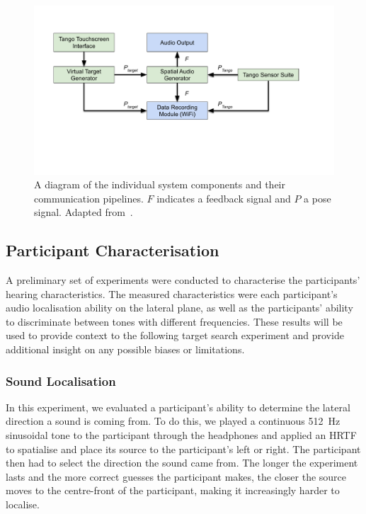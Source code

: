 \documentclass[acmsmall]{acmart}
\begin{document}
\begin{figure}
  \centering
  \includegraphics[clip=true, trim=0 120 80 50, width=0.8\columnwidth]{figures/pipeline.pdf}
  \caption{A diagram of the individual system components and their communication pipelines. $F$ indicates a feedback signal and $P$ a pose signal. Adapted from~\citet{lock2019bone}. }\label{fig:pipeline}
\end{figure}

\subsection{Participant Characterisation}\label{sec:participant_characterisation}

A preliminary set of experiments were conducted to characterise the participants' hearing characteristics.
The measured characteristics were each participant's audio localisation ability on the lateral plane, as well as the participants' ability to discriminate between tones with different frequencies. 
These results will be used to provide context to the following target search experiment and provide additional insight on any possible biases or limitations. 

\subsubsection{Sound Localisation}\label{sec:sound_localisation}

In this experiment, we evaluated a participant's ability to determine the lateral direction a sound is coming from.
To do this, we played a continuous \SI{512}{\hertz} sinusoidal tone to the participant through the headphones and applied an HRTF to spatialise and place its source to the participant's left or right.
The participant then had to select the direction the sound came from.
The longer the experiment lasts and the more correct guesses the participant makes, the closer the source moves to the centre-front of the participant, making it increasingly harder to localise. 
\end{document}
